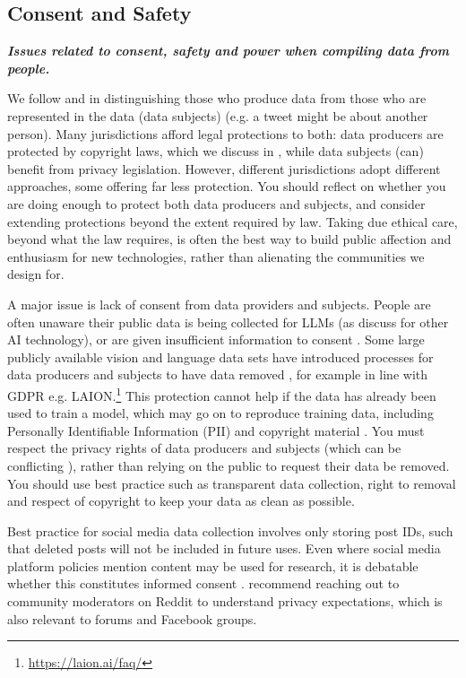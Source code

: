 \subsection{Consent and Safety}\label{sec:whose}
\noindent\textbf{\textit{Issues related to consent, safety and power when compiling data from people.}}
\newline 


\noindent We follow \citet{havens_situated_2020} and \citet{bird_typology_2023} in distinguishing those who produce data from those who are represented in the data (data subjects) (e.g. a tweet might be about another person). Many jurisdictions afford legal protections to both: data producers are protected by copyright laws, which we discuss in , while data subjects (can) benefit from privacy legislation. However, different jurisdictions adopt different approaches, some offering far less protection. You should reflect on whether you are doing enough to protect both data producers and subjects, and consider extending protections beyond the extent required by law. Taking due ethical care, beyond what the law requires, is often the best way to build public affection and enthusiasm for new technologies, rather than alienating the communities we design for.

A major issue is lack of consent from data providers and subjects. People are often unaware their public data is being collected for LLMs \citep{kim_propile_2023} (as \citet{scheuerman_human_2023, meng_owning_2021} discuss for other AI technology), or are given insufficient information to consent \citep{winograd_loose-lipped_2022, xiao_bad_2020}. Some large publicly available vision and language data sets have introduced processes for data producers and subjects to have data removed \citep{heikkila_artists_2022}, for example in line with GDPR e.g. LAION.\footnote{\url{https://laion.ai/faq/}} This protection cannot help if the data has already been used to train a model, which may go on to reproduce training data, including Personally Identifiable Information (PII) \citep{lukas_analyzing_2023} and copyright material \citep{karamolegkou_copyright_2023}. You must respect the privacy rights of data producers and subjects (which can be conflicting \citep{kekulluoglu_preserving_2018}), rather than relying on the public to request their data be removed. You should use best practice such as transparent data collection, right to removal and respect of copyright to keep your data as clean as possible.

Best practice for social media data collection involves only storing post IDs, such that deleted posts will not be included in future uses. Even where social media platform policies mention content may be used for research, it is debatable whether this constitutes informed consent \citep{fiesler_remember_2024}. \citet{fiesler_remember_2024} recommend reaching out to community moderators on Reddit to understand privacy expectations, which is also relevant to forums and Facebook groups. \citet{mancosu_what_2020}

